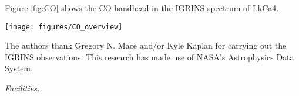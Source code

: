 \documentclass[iop,revtex4]{emulateapj}%
\newcommand{\name}{LkCa4}
\begin{document}
Figure \ref{fig:CO} shows the CO bandhead in the IGRINS spectrum of \name.

\begin{figure*}
	\centering
	\texttt{[image: figures/CO\_overview]} 
	\caption{CO bandhead in the IGRINS spectrum of \name.  The spectrum shows instrumental artifacts attributable to imperfectly corrected echelle blaze function.  Imperfect telluric correction is perceptible as conspicuous outliers present throughout the spectrum.  The red line is the SpeX spectrum of K0 Ib supergiant HD~44391 shown to guide the eye to the location of typical CO absorption in a stellar photosphere.  The emission in \name~  is seen \emph{in emission}.  }
	\label{fig:CO}
\end{figure*}


\acknowledgements
The authors thank Gregory N. Mace and/or Kyle Kaplan for carrying out the IGRINS observations. This research has made use of NASA's Astrophysics Data System.

{\it Facilities:} 

\clearpage



\end{document}
